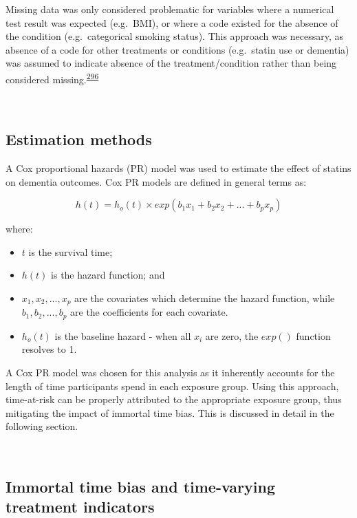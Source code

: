 \documentclass[a4paper, twoside]{templates/ociamthesis}
\providecommand{\tightlist}{%
  \setlength{\itemsep}{0pt}\setlength{\parskip}{0pt}}
\begin{document}
Missing data was only considered problematic for variables where a numerical test result was expected (e.g.~BMI), or where a code existed for the absence of the condition (e.g.~categorical smoking status). This approach was necessary, as absence of a code for other treatments or conditions (e.g.~statin use or dementia) was assumed to indicate absence of the treatment/condition rather than being considered missing.\textsuperscript{\protect\hyperlink{ref-wells2013strategies}{296}}

~

\hypertarget{estimation-methods}{%
\subsection{Estimation methods}\label{estimation-methods}}

A Cox proportional hazards (PR) model was used to estimate the effect of statins on dementia outcomes. Cox PR models are defined in general terms as:

\begin{equation}
  h(t) = h_o(t) \times exp(b_1x_1 + b_2x_2 + ... +b_px_p)
  \label{eq:cox-model}
\end{equation}

where:

\begin{itemize}
\tightlist
\item
  \(t\) is the survival time;
\item
  \(h(t)\) is the hazard function; and
\item
  \(x_1,x_2,...,x_p\) are the covariates which determine the hazard function, while \(b_1,b_2,...,b_p\) are the coefficients for each covariate.
\item
  \(h_o(t)\) is the baseline hazard - when all \(x_i\) are zero, the \(exp()\) function resolves to 1.
\end{itemize}

A Cox PR model was chosen for this analysis as it inherently accounts for the length of time participants spend in each exposure group. Using this approach, time-at-risk can be properly attributed to the appropriate exposure group, thus mitigating the impact of immortal time bias. This is discussed in detail in the following section.

~

\hypertarget{cprd-immortal-time-bias}{%
\subsection{Immortal time bias and time-varying treatment indicators}\label{cprd-immortal-time-bias}}
\end{document}
